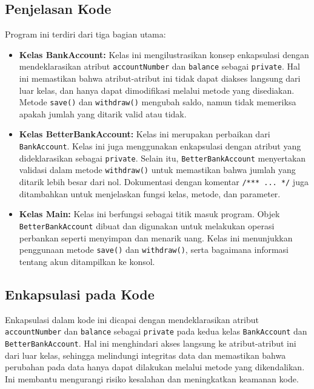\subsection{Penjelasan Kode}

Program ini terdiri dari tiga bagian utama:

\begin{itemize}
\item \textbf{Kelas BankAccount:} Kelas ini mengilustrasikan konsep enkapsulasi dengan mendeklarasikan atribut \texttt{accountNumber} dan \texttt{balance} sebagai \texttt{private}. Hal ini memastikan bahwa atribut-atribut ini tidak dapat diakses langsung dari luar kelas, dan hanya dapat dimodifikasi melalui metode yang disediakan. Metode \texttt{save()} dan \texttt{withdraw()} mengubah saldo, namun tidak memeriksa apakah jumlah yang ditarik valid atau tidak.
\item \textbf{Kelas BetterBankAccount:} Kelas ini merupakan perbaikan dari \texttt{BankAccount}. Kelas ini juga menggunakan enkapsulasi dengan atribut yang dideklarasikan sebagai \texttt{private}. Selain itu, \texttt{BetterBankAccount} menyertakan validasi dalam metode \texttt{withdraw()} untuk memastikan bahwa jumlah yang ditarik lebih besar dari nol. Dokumentasi dengan komentar \texttt{/*** ... */} juga ditambahkan untuk menjelaskan fungsi kelas, metode, dan parameter.
\item \textbf{Kelas Main:} Kelas ini berfungsi sebagai titik masuk program. Objek \texttt{BetterBankAccount} dibuat dan digunakan untuk melakukan operasi perbankan seperti menyimpan dan menarik uang. Kelas ini menunjukkan penggunaan metode \texttt{save()} dan \texttt{withdraw()}, serta bagaimana informasi tentang akun ditampilkan ke konsol.
\end{itemize}

\subsection{Enkapsulasi pada Kode}

Enkapsulasi dalam kode ini dicapai dengan mendeklarasikan atribut \texttt{accountNumber} dan \texttt{balance} sebagai \texttt{private} pada kedua kelas \texttt{BankAccount} dan \texttt{BetterBankAccount}. Hal ini menghindari akses langsung ke atribut-atribut ini dari luar kelas, sehingga melindungi integritas data dan memastikan bahwa perubahan pada data hanya dapat dilakukan melalui metode yang dikendalikan. Ini membantu mengurangi risiko kesalahan dan meningkatkan keamanan kode.

